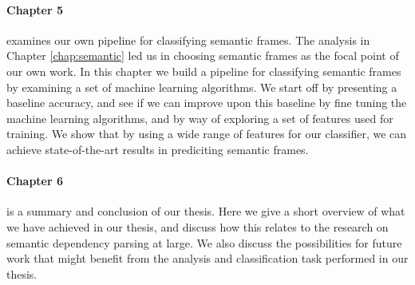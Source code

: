 \paragraph{Chapter 5} examines our own pipeline for classifying semantic frames. The analysis in Chapter \ref{chap:semantic} led us in choosing semantic frames as the focal point of our own work. In this chapter we build a pipeline for classifying semantic frames by examining a set of machine learning algorithms. We start off by presenting a baseline accuracy, and see if we can improve upon this baseline by fine tuning the machine learning algorithms, and by way of exploring a set of features used for training. We show that by using a wide range of features for our classifier, we can achieve state-of-the-art results in prediciting semantic frames.

\paragraph{Chapter 6} is a summary and conclusion of our thesis. Here we give a short overview of what we have achieved in our thesis, and discuss how this relates to the research on semantic dependency parsing at large. We also discuss the possibilities for future work that might benefit from the analysis and classification task performed in our thesis.